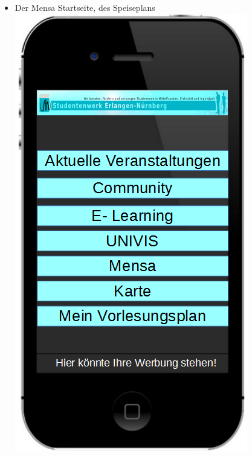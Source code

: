 \begin {itemize}
    \item Der  Mensa  Startseite, des Speiseplans\\
    \includegraphics[scale=0.4]{./inc/aufgabe05/MockupStartseite.png} 

\end{itemize}
